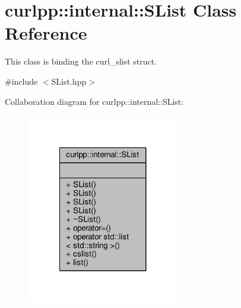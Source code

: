 \hypertarget{classcurlpp_1_1internal_1_1SList}{\section{curlpp\-:\-:internal\-:\-:S\-List Class Reference}
\label{classcurlpp_1_1internal_1_1SList}
}


This class is binding the curl\-\_\-slist struct.  




{\ttfamily \#include $<$S\-List.\-hpp$>$}



Collaboration diagram for curlpp\-:\-:internal\-:\-:S\-List\-:
\nopagebreak
\begin{figure}[H]
\begin{center}
\leavevmode
\includegraphics[width=188pt]{classcurlpp_1_1internal_1_1SList__coll__graph}
\end{center}
\end{figure}
